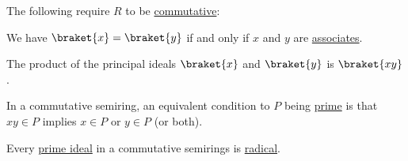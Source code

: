 \begin{proposition}
  The following require \( R \) to be \hyperref[def:semiring/commutative]{commutative}:
  \begin{thmenum}[series=thm:def:semiring_ideal/properties]
     We have \( \braket{ x } = \braket{ y } \) if and only if \( x \) and \( y \) are \hyperref[def:divisibility/associates]{associates}.

     The product of the principal ideals \( \braket{x} \) and \( \braket{y} \) is \( \braket{xy} \).

     In a commutative semiring, an equivalent condition to \( P \) being \hyperref[def:semiring_ideal/prime]{prime} is that \( xy \in P \) implies \( x \in P \) or \( y \in P \) (or both).

     Every \hyperref[def:semiring_ideal/prime]{prime ideal} in a commutative semirings is \hyperref[def:radical_ideal]{radical}.
  \end{thmenum}
\end{proposition}
